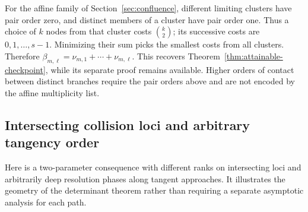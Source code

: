 \documentclass[11pt]{amsart}
\theoremstyle{definition}\newtheorem{definition}[theorem]{Definition}
\theoremstyle{remark}\newtheorem{remark}[theorem]{Remark}
\begin{document}
For the affine family of Section~\ref{sec:confluence}, different limiting
clusters have pair order zero, and distinct members of a cluster have pair
order one. Thus a choice of $k$ nodes from that cluster costs
$\binom{k}{2}$; its successive costs are $0,1,\ldots,s-1$.
Minimizing their sum picks the smallest costs from all clusters. Therefore
$\beta_{m,\ell}=\nu_{m,1}+\cdots+\nu_{m,\ell}$. This recovers
Theorem~\ref{thm:attainable-checkpoint}, while its separate proof remains
available. Higher orders of contact between distinct branches require the
pair orders above and are not encoded by the affine multiplicity list.

\subsection{Intersecting collision loci and arbitrary tangency order}
Here is a two-parameter consequence with different ranks on intersecting
loci and arbitrarily deep resolution phases along tangent approaches.
It illustrates the geometry of the determinant theorem rather than
requiring a separate asymptotic analysis for each path.
\end{document}
